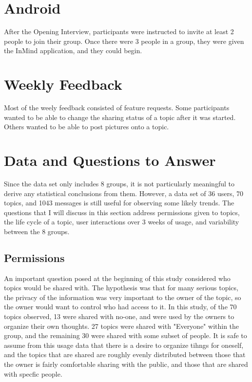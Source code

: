 \section{Android}
  After the Opening Interview, participants were instructed to invite
  at least 2 people to join their group.
  Once there were 3 people in a group,
  they were given the InMind application,
  and they could begin.

  \section{Weekly Feedback}
  Most of the weely feedback consisted of feature requests.
  Some participants wanted to be able to change the sharing status
  of a topic after it was started.
  Others wanted to be able to post pictures onto a topic.

  \section{Data and Questions to Answer}
    Since the data set only includes 8 groups,
    it is not particularly meaningful to derive any statistical conclusions
    from them.
    However, a data set of 36 users, 70 topics, and 1043 messages
    is still useful for observing some likely trends.
    The questions that I will discuss in this section address
    permissions given to topics, the life cycle of a topic,
    user interactions over 3 weeks of usage,
    and variability between the 8 groups.

    \subsection{Permissions}
    An important question posed at the beginning of this study
    considered who topics would be shared with.
    The hypothesis was that for many serious topics,
    the privacy of the information was very important to the owner of the topic,
    so the owner would want to control who had access to it.
    In this study, of the 70 topics observed, 13 were shared with no-one,
    and were used by the owners to organize their own thoughts.
    27 topics were shared with "Everyone" within the group,
    and the remaining 30 were shared with some subset of people.
    It is safe to assume from this usage data that
    there is a desire to organize tihngs for oneself,
    and the topics that are shared are roughly evenly distributed
    between those that the owner is fairly comfortable sharing with the public,
    and those that are shared with specfic people.

